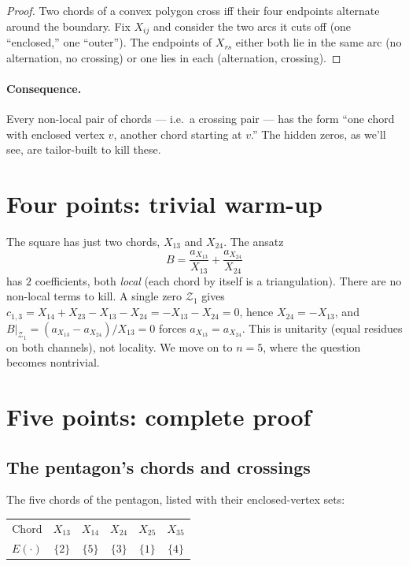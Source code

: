 \documentclass[11pt]{article}
\newcommand{\X}[2]{X_{#1#2}}
\newcommand{\Z}{\mathcal{Z}}
\theoremstyle{definition}
\begin{document}
\begin{proof}
Two chords of a convex polygon cross iff their four endpoints alternate around
the boundary. Fix $\X{i}{j}$ and consider the two arcs it cuts off (one
``enclosed,'' one ``outer''). The endpoints of $\X{r}{s}$ either both lie in
the same arc (no alternation, no crossing) or one lies in each (alternation,
crossing).
\end{proof}

\paragraph{Consequence.}
Every non-local pair of chords --- i.e.\ a crossing pair --- has the form
``one chord with enclosed vertex $v$, another chord starting at $v$.'' The
hidden zeros, as we'll see, are tailor-built to kill these.

\section{Four points: trivial warm-up}

The square has just two chords, $\X{1}{3}$ and $\X{2}{4}$. The ansatz
\[
B = \frac{a_{\X{1}{3}}}{\X{1}{3}} + \frac{a_{\X{2}{4}}}{\X{2}{4}}
\]
has $2$ coefficients, both \emph{local} (each chord by itself is a triangulation).
There are no non-local terms to kill. A single zero $\Z_1$ gives
$c_{1,3}=\X{1}{4}+\X{2}{3}-\X{1}{3}-\X{2}{4}=-\X{1}{3}-\X{2}{4}=0$, hence
$\X{2}{4}=-\X{1}{3}$, and $B|_{\Z_1}=(a_{\X{1}{3}}-a_{\X{2}{4}})/\X{1}{3}=0$
forces $a_{\X{1}{3}}=a_{\X{2}{4}}$. This is unitarity (equal residues on both
channels), not locality. We move on to $n=5$, where the question becomes
nontrivial.

\section{Five points: complete proof}
\label{sec:n5}

\subsection{The pentagon's chords and crossings}

The five chords of the pentagon, listed with their enclosed-vertex sets:
\begin{center}
\begin{tabular}{cccccc}
\toprule
Chord & $\X{1}{3}$ & $\X{1}{4}$ & $\X{2}{4}$ & $\X{2}{5}$ & $\X{3}{5}$ \\
$E(\cdot)$ & $\{2\}$ & $\{5\}$ & $\{3\}$ & $\{1\}$ & $\{4\}$ \\
\bottomrule
\end{tabular}
\end{center}
\end{document}
